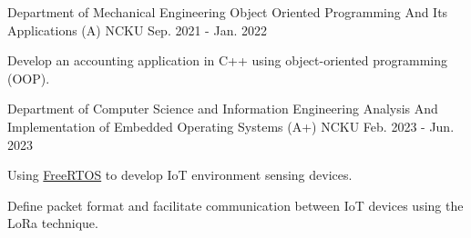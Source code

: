 

\begin{cventries}

 \iffalse
  \cventry
    {Department of Electrical Engineering} %
    {Operating System (A)} %
    {NCKU} %
    {Sep. 2020 - Jan. 2021} %
    {
    }
    
  \cventry
    {Department of Electrical Engineering} %
    {Data Structures (A-)} %
    {NCKU} %
    {Feb. 2021 - Jun. 2021} %
    {
      \begin{cvitems} %
        \item {I implemented and analyzed various sorting algorithms, systematically evaluating their time complexity and space complexity to gain insights into their efficiency and performance.}
      \end{cvitems}
    }
  \fi
  \cventry
    {Department of Mechanical Engineering} %
    {Object Oriented Programming And Its Applications (A)} %
    {NCKU} %
    {Sep. 2021 - Jan. 2022} %
    {
      \begin{cvitems} %
        \item {Develop an accounting application in C++ using object-oriented programming (OOP).}
      \end{cvitems}
    }
    
  \cventry
    {Department of Computer Science and Information Engineering} %
    {Analysis And Implementation of Embedded Operating Systems (A+)} %
    {NCKU} %
    {Feb. 2023 - Jun. 2023} %
    {
      \begin{cvitems} %
        \item {Using \href{https://www.freertos.org/}{FreeRTOS} to develop IoT environment sensing devices.}
        \item {Define packet format and facilitate communication between IoT devices using the LoRa technique.}
      \end{cvitems}
    }
    

\end{cventries}
